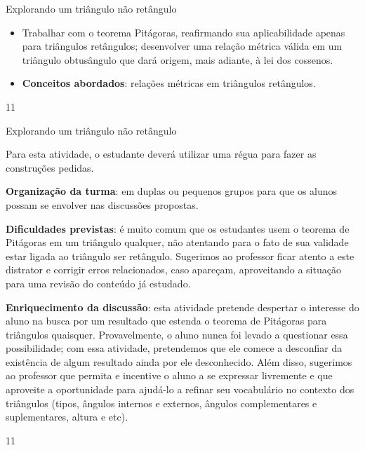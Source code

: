 \def\currentcolor{session1}
\begin{objectives}{Explorando um triângulo não retângulo}
{
\begin{itemize}
\item Trabalhar com o teorema Pitágoras, reafirmando sua aplicabilidade apenas para triângulos retângulos; desenvolver uma relação métrica válida em um triângulo obtusângulo que dará origem, mais adiante, à lei dos cossenos.
\item \textbf{Conceitos abordados}: relações métricas em triângulos retângulos.
\end{itemize}
}{1}{1}
\end{objectives}
\begin{sugestions}{Explorando um triângulo não retângulo}
{

Para esta atividade, o estudante deverá utilizar uma régua para fazer as construções pedidas.

\textbf{Organização da turma}: em duplas ou pequenos grupos para que os alunos possam se envolver nas discussões propostas.

\textbf{Dificuldades previstas}: é muito comum que os estudantes usem o teorema de Pitágoras em um triângulo qualquer, não atentando para o fato de sua validade estar ligada ao triângulo ser retângulo. Sugerimos ao professor ficar atento a este distrator e corrigir erros relacionados, caso apareçam, aproveitando a situação para uma revisão do conteúdo já estudado.

\textbf{Enriquecimento da discussão}: esta atividade pretende despertar o interesse do aluno na busca por um resultado que estenda o teorema de Pitágoras para triângulos quaisquer. Provavelmente, o aluno nunca foi levado a questionar essa possibilidade; com essa atividade, pretendemos que ele comece a desconfiar da existência de algum resultado ainda por ele desconhecido. Além disso, sugerimos ao professor que permita e incentive o aluno a se expressar livremente e que aproveite a oportunidade para ajudá-lo a refinar seu vocabulário no contexto dos triângulos (tipos, ângulos internos e externos, ângulos complementares e suplementares, altura e etc).  
}{1}{1}
\end{sugestions}
